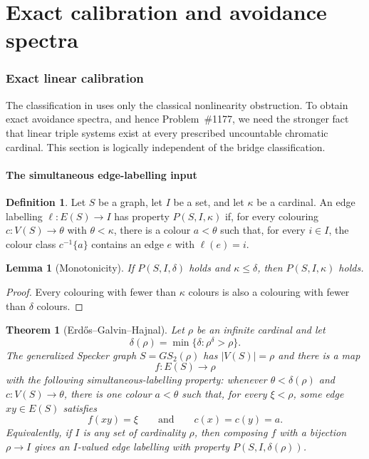 \documentclass[11pt]{amsart}
\newtheorem{theorem}{Theorem}[section]
\newtheorem{lemma}[lemma]{Lemma}
\theoremstyle{definition}
\newtheorem{definition}[definition]{Definition}
\theoremstyle{remark}
\numberwithin{equation}{section}
\begin{document}
\part{Exact calibration and avoidance spectra}

\section{Exact linear calibration}
\label{sec:linear}

The classification in  uses only the classical
nonlinearity obstruction.  To obtain exact avoidance spectra, and hence
Problem~\#1177, we need the stronger fact that linear triple systems
exist at every prescribed uncountable chromatic cardinal.  This section
is logically independent of the bridge classification.

\subsection{The simultaneous edge-labelling input}

\begin{definition}
Let $S$ be a graph, let $I$ be a set, and let $\kappa$ be a cardinal.
An edge labelling $\ell:E(S)\to I$ has property $P(S,I,\kappa)$ if, for
every colouring $c:V(S)\to\theta$ with $\theta<\kappa$, there is a
colour $a<\theta$ such that, for every $i\in I$, the colour class
$c^{-1}\{a\}$ contains an edge $e$ with $\ell(e)=i$.
\end{definition}

\begin{lemma}[Monotonicity]
\label{lem:P-monotone}
If $P(S,I,\delta)$ holds and $\kappa\le\delta$, then $P(S,I,\kappa)$
holds.
\end{lemma}

\begin{proof}
Every colouring with fewer than $\kappa$ colours is also a colouring with
fewer than $\delta$ colours.
\end{proof}

\begin{theorem}[Erd\H{o}s--Galvin--Hajnal]
\label{thm:EGH-P}
Let $\rho$ be an infinite cardinal and let
\[
 \delta(\rho)=\min\{\delta:\rho^\delta>\rho\}.
\]
The generalized Specker graph $S=GS_2(\rho)$ has $|V(S)|=\rho$ and
there is a map
\[
  f:E(S)\longrightarrow\rho
\]
with the following simultaneous-labelling property: whenever
$\theta<\delta(\rho)$ and $c:V(S)\to\theta$, there is one colour
$a<\theta$ such that, for every $\xi<\rho$, some edge $xy\in E(S)$
satisfies
\[
  f(xy)=\xi
  \qquad\text{and}\qquad
  c(x)=c(y)=a.
\]
Equivalently, if $I$ is any set of cardinality $\rho$, then composing
$f$ with a bijection $\rho\to I$ gives an $I$-valued edge labelling with
property $P(S,I,\delta(\rho))$.
\end{theorem}
\end{document}

